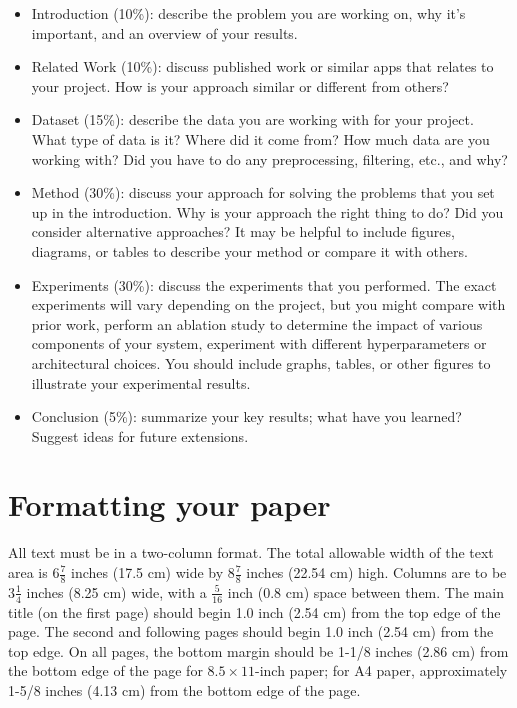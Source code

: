 \documentclass[10pt,twocolumn,letterpaper]{article}
\begin{document}
\begin{itemize}
	\item Introduction (10\%): describe the problem you are working on, why it's important, and an overview of your results.
	\item Related Work (10\%): discuss published work or similar apps that relates to your project. How is your approach similar or different from others?
	\item Dataset (15\%): describe the data you are working with for your project. What type of data is it? Where did it come from? How much data are you working with? Did you have to do any preprocessing, filtering, etc., and why?
	\item Method (30\%): discuss your approach for solving the problems that you set up in the introduction. Why is your approach the right thing to do? Did you consider alternative approaches? It may be helpful to include figures, diagrams, or tables to describe your method or compare it with others.
	\item Experiments (30\%): discuss the experiments that you performed. The exact experiments will vary depending on the project, but you might compare with prior work, perform an ablation study to determine the impact of various components of your system, experiment with different hyperparameters or architectural choices. You should include graphs, tables, or other figures to illustrate your experimental results.
	\item Conclusion (5\%): summarize your key results; what have you learned? Suggest ideas for future extensions.
\end{itemize}	

\section{Formatting your paper}

All text must be in a two-column format. The total allowable width of the
text area is $6\frac78$ inches (17.5 cm) wide by $8\frac78$ inches (22.54
cm) high. Columns are to be $3\frac14$ inches (8.25 cm) wide, with a
$\frac{5}{16}$ inch (0.8 cm) space between them. The main title (on the
first page) should begin 1.0 inch (2.54 cm) from the top edge of the
page. The second and following pages should begin 1.0 inch (2.54 cm) from
the top edge. On all pages, the bottom margin should be 1-1/8 inches (2.86
cm) from the bottom edge of the page for $8.5 \times 11$-inch paper; for A4
paper, approximately 1-5/8 inches (4.13 cm) from the bottom edge of the
page.
\end{document}
